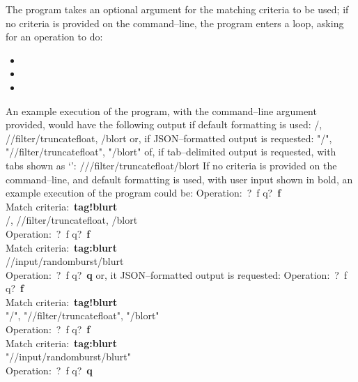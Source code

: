 The program takes an optional argument for the matching criteria to be used; if no
criteria is provided on the command--line, the program enters a loop, asking for an
operation to do:
\begin{itemize}
\item {}
\item {}
\item {}
\end{itemize}
An example execution of the program, with the command--line argument 
provided, would have the following output if default formatting is used:
\outputBegin{}
/\dollarService, /\serviceName/filter/truncatefloat, /blort
\outputEnd{}
or, if JSON--formatted output is requested:
\outputBegin{}
\openSq{} "/\dollarService", "/\serviceName/filter/truncatefloat", "/blort" \closeSq
\outputEnd{}
of, if tab--delimited output is requested, with tabs shown as `\tabSymbol':
\outputBegin{}
/\dollarService\pseudotab/\serviceName/filter/truncatefloat\pseudotab/blort
\outputEnd{}
If no criteria is provided on the command--line, and default formatting is used, with
user input shown in bold, an example execution of the program could be:
\outputBegin{}
Operation:\ \openSq{}?\ f q\closeSq{}?\ \textbf{f}\\
Match criteria:\ \textbf{tag!blurt}\\
/\dollarService, /\serviceName/filter/truncatefloat, /blort\\
Operation:\ \openSq{}?\ f q\closeSq{}?\ \textbf{f}\\
Match criteria:\ \textbf{tag:blurt}\\
/\serviceName/input/randomburst/blurt\\
Operation:\ \openSq{}?\ f q\closeSq{}?\ \textbf{q}
\outputEnd{}
or, it JSON--formatted output is requested:
\outputBegin{}
Operation:\ \openSq{}?\ f q\closeSq{}?\ \textbf{f}\\
Match criteria:\ \textbf{tag!blurt}\\
\openSq{} "/\dollarService", "/\serviceName/filter/truncatefloat", "/blort" \closeSq{}\\
Operation:\ \openSq{}?\ f q\closeSq{}?\ \textbf{f}\\
Match criteria:\ \textbf{tag:blurt}\\
\openSq{} "/\serviceName/input/randomburst/blurt" \closeSq{}\\
Operation:\ \openSq{}?\ f q\closeSq{}?\ \textbf{q}
